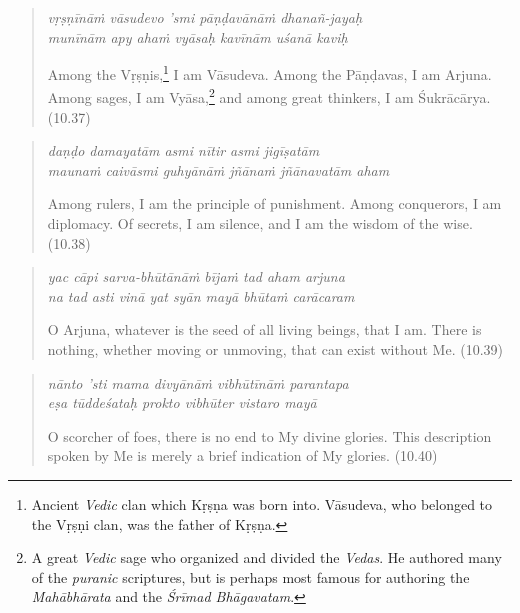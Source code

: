 \documentclass[12pt, twoside, openright]{memoir}
\begin{document}
\par
\begin{verse}
\textit{vṛṣṇīnāṁ vāsudevo ’smi pāṇḍavānāṁ dhanañ-jayaḥ} \\
\textit{munīnām apy ahaṁ vyāsaḥ kavīnām uśanā kaviḥ}

\noindent Among the Vṛṣṇis,\footnote{Ancient \textit{Vedic} clan which Kṛṣṇa was born into. Vāsudeva, who belonged to the Vṛṣṇi clan, was the father of Kṛṣṇa.} I am Vāsudeva. Among the Pāṇḍavas, I am Arjuna. Among sages, I am Vyāsa,\footnote{A great \textit{Vedic} sage who organized and divided the \textit{Vedas}. He authored many of the \textit{puranic} scriptures, but is perhaps most famous for authoring the \textit{Mahābhārata} and the \textit{Śrīmad Bhāgavatam}.} and among great thinkers, I am Śukrācārya. (10.37)
\end{verse}
\par



\par
\begin{verse}
\textit{daṇḍo damayatām asmi nītir asmi jigīṣatām} \\
\textit{maunaṁ caivāsmi guhyānāṁ jñānaṁ jñānavatām aham}

\noindent Among rulers, I am the principle of punishment. Among conquerors, I am diplomacy. Of secrets, I am silence, and I am the wisdom of the wise. (10.38)
\end{verse}
\par



\par
\begin{verse}
\textit{yac cāpi sarva-bhūtānāṁ bījaṁ tad aham arjuna} \\
\textit{na tad asti vinā yat syān mayā bhūtaṁ carācaram}

\noindent O Arjuna, whatever is the seed of all living beings, that I am. There is nothing, whether moving or unmoving, that can exist without Me. (10.39)
\end{verse}
\par



\par
\begin{verse}
\textit{nānto ’sti mama divyānāṁ vibhūtīnāṁ parantapa} \\
\textit{eṣa tūddeśataḥ prokto vibhūter vistaro mayā}

\noindent O scorcher of foes, there is no end to My divine glories. This description spoken by Me is merely a brief indication of My glories. (10.40)
\end{verse}
\par
\end{document}
